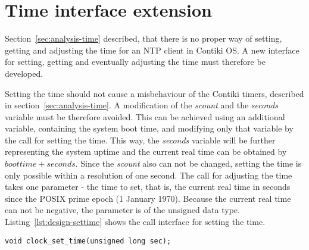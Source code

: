 
\section{Time interface extension}\label{sec:design-interface}
Section~\ref{sec:analysis-time} described, that there is no proper
way of setting, getting and adjusting the time for an NTP client in Contiki OS.
A new interface for setting, getting and eventually adjusting the time
must therefore be developed.

Setting the time should not cause a misbehaviour of the Contiki timers,
described in section~\ref{sec:analysis-time}.
A modification of the {\it{scount}} and the {\it{seconds}} variable must be therefore avoided.
This can be achieved using an additional variable, containing the system boot time,
and modifying only that variable by the call for setting the time.
This way, the {\it{seconds}} variable will be further representing the system uptime
and the current real time can be obtained by $boottime + seconds$.
Since the {\it{scount}} also can not be changed, setting the time is only possible
within a resolution of one second.
The call for adjusting the time takes one parameter - the time to set, that is, the current real time in
seconds since the POSIX prime epoch (1 January 1970).
Because the current real time can not be negative, the parameter is of the unsigned data type.
Listing~\ref{lst:design-settime} shows the call interface for setting the time.
\begin{lstlisting}[caption={Call interface for setting the time},label={lst:design-settime}]
void clock_set_time(unsigned long sec);
\end{lstlisting}

